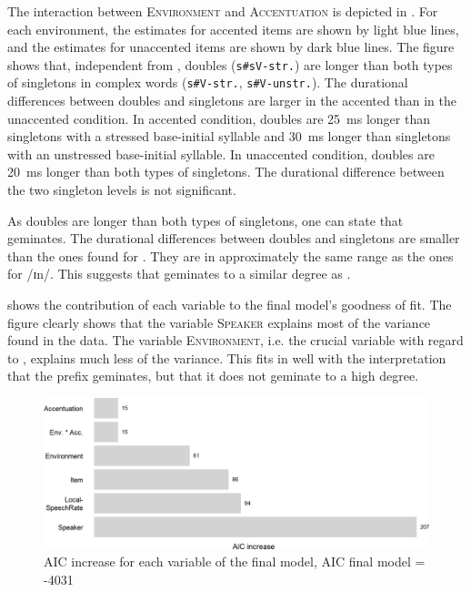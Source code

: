 The interaction between \textsc{Environment} and \textsc{Accentuation} is depicted in . For each environment, the estimates for accented items are shown by light blue lines, and the estimates for unaccented items are shown by dark blue lines.
The figure shows that,  
independent from , doubles (\texttt{s\#sV-str.}) are longer than both types of singletons in complex words (\texttt{s\#V-str.}, \texttt{s\#V-unstr.}). The durational differences between doubles and singletons are larger in the accented than in the unaccented condition. 
In accented condition, doubles are 25~ms longer than singletons with a stressed base-initial syllable and 30~ms longer than singletons with an unstressed base-initial syllable. 
In unaccented condition, doubles are 20~ms longer than both types of singletons. 
The durational difference between the two singleton levels is not significant.

As doubles are longer than both types of singletons, one can state that  geminates. The durational differences between doubles and singletons are smaller than the ones found for . They are in approximately the same range as the ones for /ɪn/. This suggests that  geminates to a similar degree as .



 shows the contribution of each variable to the final model's goodness of fit.
The figure clearly shows that the variable \textsc{Speaker} explains most of the variance found in the data. The variable 
\textsc{Environment}, i.e. the crucial variable with regard to , explains much less of the variance. This fits in well with the interpretation that the prefix  geminates, but that it does not geminate to a high degree.


\begin{figure}
	
	\includegraphics[scale=0.7]{images/Experiment/AICdecreaseDisComplex.png}
	\caption{AIC increase for each variable of the final model, AIC final model = -4031}
	\label{fig:Effectsize dis experiment}

\end{figure}




